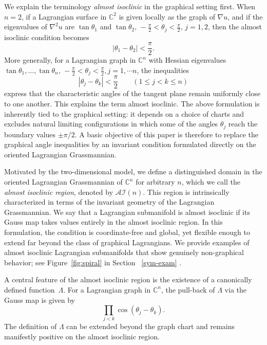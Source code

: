 \documentclass[11pt]{amsart}
\numberwithin{equation}{section}
\theoremstyle{definition}
\theoremstyle{definition}
\begin{document}
We explain the terminology \textit{almost isoclinic} in the graphical setting first. 
When $n=2$, if a Lagrangian surface in $\mathbb{C}^2$ is given locally as the graph of $\nabla u$, and if the eigenvalues of $\nabla^2 u$ are $\tan\theta_1$ and $\tan\theta_2,
\,-\frac{\pi}{2}<\theta_j<\frac{\pi}{2}, \,j=1,2$, then the almost isoclinic condition becomes 
\[ |\theta_1-\theta_2|<\frac{\pi}{2}. \] 
More generally, for a Lagrangian graph in $\mathbb{C}^n$ with Hessian eigenvalues $\tan\theta_1,\dots,\tan\theta_n,\, -\frac{\pi}{2}<\theta_j<\frac{\pi}{2}, j=1,\cdots n$, the inequalities 
\begin{equation} \label{eq:AI_angle}
|\theta_j-\theta_k|<\frac{\pi}{2}
\qquad (1\le j<k\le n) 
\end{equation} 
express that the characteristic angles of the tangent plane remain uniformly close to one another. 
This explains the term almost isoclinic. 
The above formulation is inherently tied to the graphical setting: it depends on a choice of charts and excludes natural limiting configurations in which some of the angles $\theta_j$ reach the boundary values $\pm \pi/2$. 
A basic objective of this paper is therefore to replace the graphical angle inequalities by an invariant condition formulated directly on the oriented Lagrangian Grassmannian. 

Motivated by the two-dimensional model, we define a distinguished domain in the oriented Lagrangian Grassmannian of $\mathbb{C}^n$ for arbitrary $n$, which we call the \textit{almost isoclinic region}, denoted by $\mathcal{AI}(n).$ 
This region is intrinsically characterized in terms of the invariant geometry of the Lagrangian Grassmannian. 
We say that a Lagrangian submanifold is almost isoclinic if its Gauss map takes values entirely in the almost isoclinic region. 
In this formulation, the condition is coordinate-free and global, yet flexible enough to extend far beyond the class of graphical Lagrangians.  
We provide examples of almost isoclinic Lagrangian submanifolds that show genuinely non-graphical behavior; see Figure~\ref{fig:spiral} in Section ~\ref{sym-exam} .

A central feature of the almost isoclinic region is the existence of a canonically defined function~$\Lambda$. 
For a Lagrangian graph in $\mathbb{C}^n$, the pull-back of $\Lambda $ via the Gauss map is given by 
\begin{equation}
\prod_{j<k} \cos(\theta_j-\theta_k).
\end{equation}
The definition of $\Lambda$ can be extended beyond the graph chart and remains manifestly positive on the almost isoclinic region. 
\end{document}

